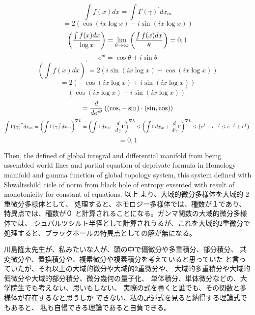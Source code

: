\documentclass{jsarticle}
\begin{document}
{   $$ \int f(x)dx = \int \Gamma(\gamma)^{'}dx_m $$
   $$ = 2 (\cos (i x \log x) - i \sin(i x \log x)) $$
   $$ \left({{\int f(x) dx} \over \log x}\right) = \lim_{\theta \to \infty}
    \left({{\int f(x) dx} \over \theta}\right) = 0,1 $$
    $$ e^{i \theta} = \cos \theta + i \sin \theta $$
    $$ \left({\int f(x) dx}\right)^{'} = 2 (i \sin(i x \log x) - \cos (i x \log
    x)) $$
    $$ = 2(- \cos(i x \log x) + i \sin(i x \log x)) $$
    $$ (\cos (i x \log x) - i \sin(i x \log x))^{'} $$
    $$ = {d \over {d {e^{i\theta}}}}\left((\cos, - \sin )\cdot
    (\sin, \cos)\right)  $$
    $$ \int \Gamma(\gamma)^{''}dx_m = \left({\int \Gamma(\gamma)^{'}}dx_m
    \right)^{\nabla L} = \left({{\int \Gamma dx_m} \cdot {{d \over d\gamma}
    \Gamma}}\right)^{\nabla L} \le 
    \left({\int \Gamma dx_m + {d \over d\gamma}\Gamma}\right)^{\nabla L} \le 
    \left({e^{f} - e^{-f}} \le {e^{-f} + e^{f}}\right)^{'}  $$
    $$ = 0,1 $$

    Then, the defined of global integral and differential manifold
    from being assembled world lines and partial equation of deprivate
    formula in Homology manifold and gamma function of global topology
    system, this system defined with Shwaltsshild cicle of norm from
    black hole of entropy exsented with result of monotonicity for
    constant of equations.
    以上 より、大域的微分多様体を大域的 2重微分多様体として、
    処理すると、ホモロジー多様体では、種数が１であり、特異点では、種数が０
    と計算されることになる。ガンマ関数の大域的微分多様体では、
    シュバルツシルト半径として計算されうるが、これを大域的2重微分で
    処理すると、ブラックホールの特異点としての解が無になる。

    川島隆太先生が、私みたいな人が、頭の中で偏微分や多重積分、部分積分、
    共変微分や、置換積分や、複素微分や複素積分を考えていると思っていた
    と言っていたが、それ以上の大域的微分や大域的2重微分や、
    大域的多重積分や大域的偏微分や大域的部分積分、微分幾何の量子化、
    単体積分、単体微分などの、大学院生でも考えない、思いもしない、
    実際の式を書くと誰でも、その関数と多様体が存在するなと思うしか
    できない、私の記述式を見ると納得する理論式でもあると、
    私も自慢できる理論であると自負できる。

}
\end{document}

